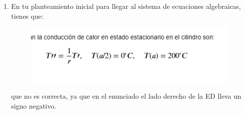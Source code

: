 \begin{enumerate}
\item En tu planteamiento inicial para llegar al sistema de ecuaciones algebraicas, tienes que:
\begin{figure}[H]
    \centering
    \includegraphics[scale=1]{Evidencia_02_05_00_Antonio.png}
\end{figure}
que no es correcta, ya que en el enunciado el lado derecho de la ED  lleva un signo negativo.


\end{enumerate}
